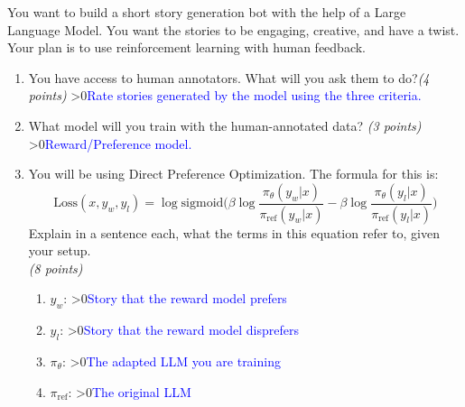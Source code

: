 \documentclass[12pt]{article}
\newcounter{showsolution}
\newcommand{\solution}[2]{\ifnum\value{showsolution}>0{\textcolor{blue}{#1}}\else{#2}\fi}
\newcounter{QuestionCounter}
\newcommand{\Question}[2]{\refstepcounter{QuestionCounter} \textbf{\Large {Q\arabic{QuestionCounter}}. #1\hfill\textit{#2 points}}}
\begin{document}
You want to build a short story generation bot with the help of a Large Language Model. You want the stories to be engaging, creative, and have a twist. Your plan is to use reinforcement learning with human feedback.
\begin{enumerate}
\item You have access to human annotators. What will you ask them to do?\hfill{\em (4 points)}
\solution{Rate stories generated by the model using the three criteria.}{\vspace{4cm}}
\item What model will you train with the human-annotated data?
\hfill{\em (3 points)}
\solution{Reward/Preference model.}{\vspace{4cm}}
\item You will be using Direct Preference Optimization. The formula for this is:
\begin{equation*}
\text{Loss}(x,y_w,y_l) = \log \text{sigmoid} \Big( \beta \log \frac{\pi_\theta(y_w|x)}{\pi_\text{ref}(y_w|x)} - \beta \log \frac{\pi_\theta(y_l|x)}{\pi_\text{ref}(y_l|x)} \Big)
\end{equation*}
Explain in a sentence each, what the terms in this equation refer to, given your setup.\\ \phantom{x}\hfill{\em (8 points)}
\begin{enumerate}\itemsep 10mm
    \item $y_w$: \solution{Story that the reward model prefers}{}
    \item $y_l$: \solution{Story that the reward model disprefers}{}
    \item $\pi_\theta$: \solution{The adapted LLM you are training}{}
    \item $\pi_\text{ref}$: \solution{The original LLM}{}
\end{enumerate}
\end{enumerate}




\end{document}
